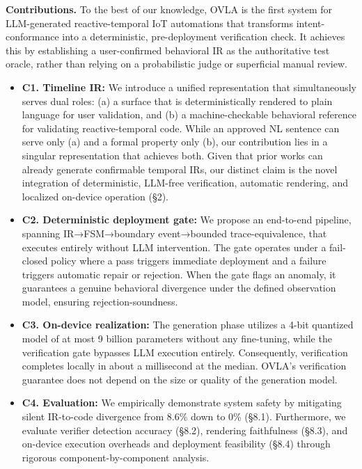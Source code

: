 \documentclass[sigconf,nonacm,anonymous,review]{acmart}
\begin{document}
\medskip\noindent\textbf{Contributions.} 
To the best of our knowledge, OVLA is the first system for LLM-generated reactive-temporal IoT automations that transforms intent-conformance into a deterministic, pre-deployment verification check. It achieves this by establishing a user-confirmed behavioral IR as the authoritative test oracle, rather than relying on a probabilistic judge or superficial manual review. %
\begin{itemize}
\item \textbf{C1. Timeline IR:} We introduce a unified representation that simultaneously serves dual roles: %
(a) a surface that is deterministically rendered to plain language for user validation, and (b) a machine-checkable behavioral reference for validating reactive-temporal code. While an approved NL sentence can serve only (a) and a formal property only (b), our contribution lies in a singular representation that achieves both. Given that prior works can already generate confirmable temporal IRs, our distinct claim is the novel integration of deterministic, LLM-free verification, automatic rendering, and localized on-device operation %
(\S2).
\item \textbf{C2. Deterministic deployment gate:} We propose an end-to-end pipeline, spanning IR→FSM→boundary event→bounded trace-equivalence, that executes entirely without LLM intervention. The gate operates under a fail-closed policy where a pass triggers immediate deployment and a failure triggers automatic repair or rejection. %
When the gate flags an anomaly, it guarantees a genuine behavioral divergence under the defined observation model, ensuring rejection-soundness.
\item \textbf{C3. On-device realization:} The generation phase utilizes a 4-bit quantized model of at most 9 billion parameters without any fine-tuning, while the verification gate bypasses LLM execution entirely. Consequently, verification completes locally in about a millisecond at the median. OVLA's verification guarantee does not depend on the size or quality of the generation model.
\item \textbf{C4. Evaluation:} We empirically demonstrate system safety by mitigating silent IR-to-code divergence from 8.6\% down to 0\% (\S8.1). Furthermore, we evaluate verifier detection accuracy (\S8.2), rendering faithfulness (\S8.3), and on-device execution overheads and deployment feasibility (\S8.4) through rigorous component-by-component analysis.
\end{itemize}
\end{document}
